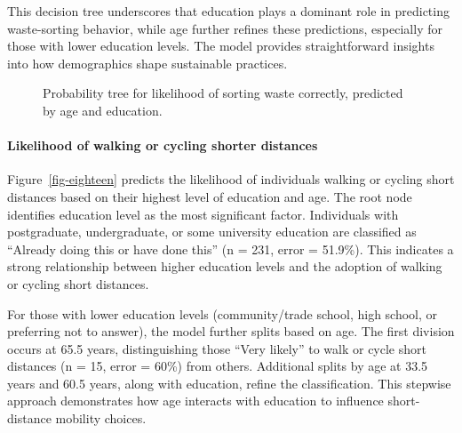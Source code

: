 \documentclass[
  letterpaper,
  DIV=11,
  numbers=noendperiod]{scrartcl}
\let\oldparagraph\paragraph
\renewcommand{\paragraph}[1]{\oldparagraph{#1}\mbox{}}
\begin{document}
This decision tree underscores that education plays a dominant role in
predicting waste-sorting behavior, while age further refines these
predictions, especially for those with lower education levels. The model
provides straightforward insights into how demographics shape
sustainable practices.

\begin{figure}


\caption{\label{fig-seventeen}Probability tree for likelihood of sorting
waste correctly, predicted by age and education.}

\end{figure}%

\paragraph{Likelihood of walking or cycling shorter
distances}\label{likelihood-of-walking-or-cycling-shorter-distances}

Figure~\ref{fig-eighteen} predicts the likelihood of individuals walking
or cycling short distances based on their highest level of education and
age. The root node identifies education level as the most significant
factor. Individuals with postgraduate, undergraduate, or some university
education are classified as ``Already doing this or have done this'' (n
= 231, error = 51.9\%). This indicates a strong relationship between
higher education levels and the adoption of walking or cycling short
distances.

For those with lower education levels (community/trade school, high
school, or preferring not to answer), the model further splits based on
age. The first division occurs at 65.5 years, distinguishing those
``Very likely'' to walk or cycle short distances (n = 15, error = 60\%)
from others. Additional splits by age at 33.5 years and 60.5 years,
along with education, refine the classification. This stepwise approach
demonstrates how age interacts with education to influence
short-distance mobility choices.
\end{document}
